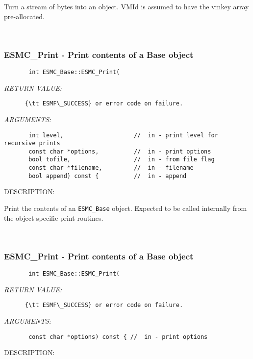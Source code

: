       Turn a stream of bytes into an object.  VMId is assumed to have the
      vmkey array pre-allocated.
   
 
\mbox{}\hrulefill\
 
\subsubsection [ESMC\_Print] {ESMC\_Print - Print contents of a Base object}


  
\begin{verbatim}       int ESMC_Base::ESMC_Print(\end{verbatim}{\em RETURN VALUE:}
\begin{verbatim}      {\tt ESMF\_SUCCESS} or error code on failure.\end{verbatim}{\em ARGUMENTS:}
\begin{verbatim}       int level,                    //  in - print level for recursive prints
       const char *options,          //  in - print options
       bool tofile,                  //  in - from file flag
       const char *filename,         //  in - filename
       bool append) const {          //  in - append\end{verbatim}
{\sf DESCRIPTION:\\ }


      Print the contents of an {\tt ESMC\_Base} object.  Expected to be
      called internally from the object-specific print routines.
   
 
\mbox{}\hrulefill\
 
\subsubsection [ESMC\_Print] {ESMC\_Print - Print contents of a Base object}


  
\begin{verbatim}       int ESMC_Base::ESMC_Print(\end{verbatim}{\em RETURN VALUE:}
\begin{verbatim}      {\tt ESMF\_SUCCESS} or error code on failure.\end{verbatim}{\em ARGUMENTS:}
\begin{verbatim}       const char *options) const { //  in - print options\end{verbatim}
{\sf DESCRIPTION:\\ }


